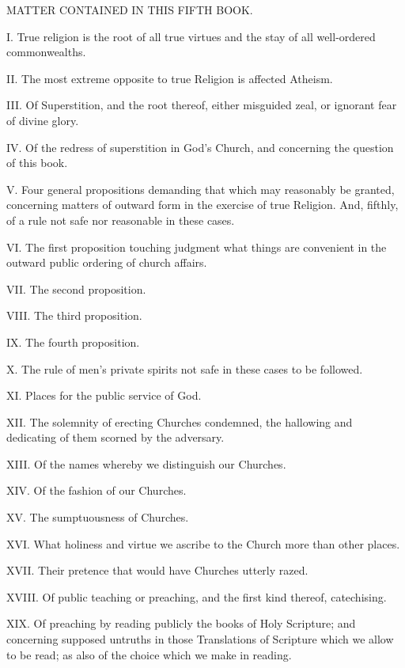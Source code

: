 



MATTER CONTAINED IN THIS FIFTH BOOK.

I. True religion is the root of all true virtues and the stay of all well-ordered commonwealths.

II. The most extreme opposite to true Religion is affected Atheism.

III. Of Superstition, and the root thereof, either misguided zeal, or ignorant fear of divine glory.

IV. Of the redress of superstition in God’s Church, and concerning the question of this book.

V. Four general propositions demanding that which may reasonably be granted, concerning matters of outward form in the exercise of true Religion. And, fifthly, of a rule not safe nor reasonable in these cases.

VI. The first proposition touching judgment what things are convenient in the outward public ordering of church affairs.

VII. The second proposition.

VIII. The third proposition.

IX. The fourth proposition.

X. The rule of men’s private spirits not safe in these cases to be followed.

XI. Places for the public service of God.

XII. The solemnity of erecting Churches condemned, the hallowing and dedicating of them scorned by the adversary.

XIII. Of the names whereby we distinguish our Churches.

XIV. Of the fashion of our Churches.

XV. The sumptuousness of Churches.

XVI. What holiness and virtue we ascribe to the Church more than other places.

XVII. Their pretence that would have Churches utterly razed.

XVIII. Of public teaching or preaching, and the first kind thereof, catechising.

XIX. Of preaching by reading publicly the books of Holy Scripture; and concerning supposed untruths in those Translations of Scripture which we allow to be read; as also of the choice which we make in reading.  


